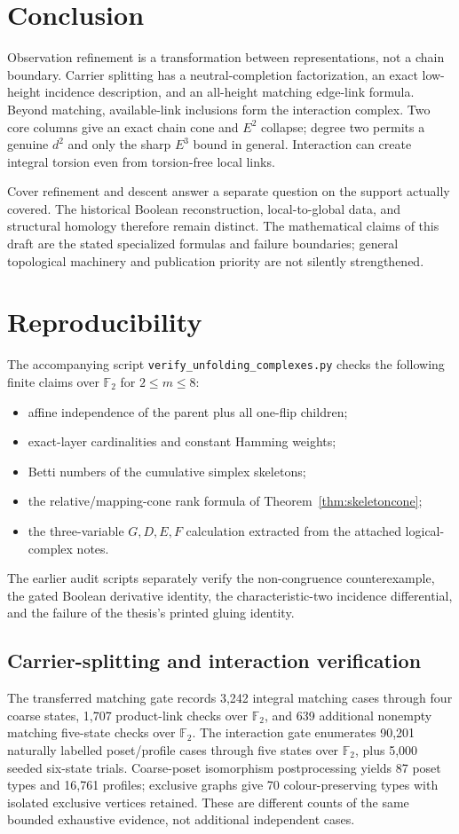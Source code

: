 \documentclass[11pt]{article}
\newcommand{\Ftwo}{\mathbb F_2}
\begin{document}
\section{Conclusion}
Observation refinement is a transformation between representations, not a
chain boundary.  Carrier splitting has a neutral-completion factorization,
an exact low-height incidence description, and an all-height matching
edge-link formula.  Beyond matching, available-link inclusions form the
interaction complex.  Two core columns give an exact chain cone and
$E^2$ collapse; degree two permits a genuine $d^2$ and only the sharp
$E^3$ bound in general.  Interaction can create integral torsion even from
torsion-free local links.

Cover refinement and descent answer a separate question on the support
actually covered.  The historical Boolean reconstruction, local-to-global
data, and structural homology therefore remain distinct.  The mathematical
claims of this draft are the stated specialized formulas and failure
boundaries; general topological machinery and publication priority are not
silently strengthened.

\appendix
\section{Reproducibility}
The accompanying script \texttt{verify\_unfolding\_complexes.py} checks the following finite claims over $\Ftwo$ for $2\le m\le8$:
\begin{itemize}
\item affine independence of the parent plus all one-flip children;
\item exact-layer cardinalities and constant Hamming weights;
\item Betti numbers of the cumulative simplex skeletons;
\item the relative/mapping-cone rank formula of Theorem~\ref{thm:skeletoncone};
\item the three-variable $G,D,E,F$ calculation extracted from the attached logical-complex notes.
\end{itemize}
The earlier audit scripts separately verify the non-congruence counterexample, the gated Boolean derivative identity, the characteristic-two incidence differential, and the failure of the thesis's printed gluing identity.

\subsection{Carrier-splitting and interaction verification}
The transferred matching gate records 3,242 integral matching cases through
four coarse states, 1,707 product-link checks over $\mathbb F_2$, and 639
additional nonempty matching five-state checks over $\mathbb F_2$.
The interaction gate enumerates 90,201 naturally labelled poset/profile
cases through five states over $\mathbb F_2$, plus 5,000 seeded six-state
trials.  Coarse-poset isomorphism postprocessing yields 87 poset types and
16,761 profiles; exclusive graphs give 70 colour-preserving types with
isolated exclusive vertices retained.  These are different counts of the
same bounded exhaustive evidence, not additional independent cases.
\end{document}
